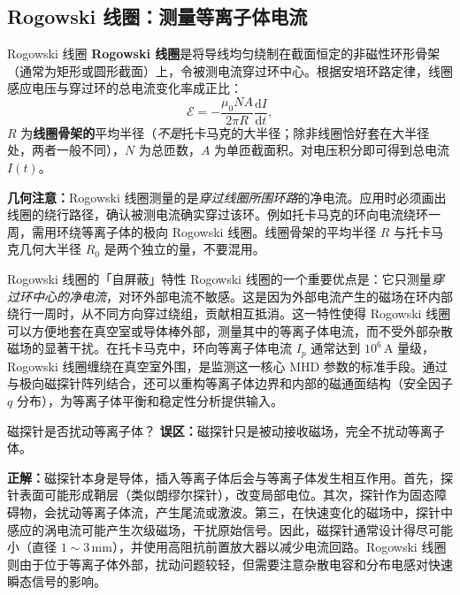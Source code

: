 \documentclass[12pt,a4paper,openany,oneside]{book}
\newcommand{\diff}{\mathrm{d}}
\begin{document}
\subsection{Rogowski 线圈：测量等离子体电流}

\begin{definition}{Rogowski 线圈}{}{}
\textbf{Rogowski 线圈}是将导线均匀绕制在截面恒定的非磁性环形骨架（通常为矩形或圆形截面）上，令被测电流穿过环中心。根据安培环路定律，线圈感应电压与穿过环的总电流变化率成正比：
\begin{equation}
\mathcal{E} = -\frac{\mu_0 N A}{2\pi R}\frac{\diff I}{\diff t},
\label{eq:rogowski}
\end{equation}
$R$ 为\textbf{线圈骨架的}平均半径（\emph{不是}托卡马克的大半径；除非线圈恰好套在大半径处，两者一般不同），$N$ 为总匝数，$A$ 为单匝截面积。对电压积分即可得到总电流 $I(t)$。

\textbf{几何注意：}Rogowski 线圈测量的是\emph{穿过线圈所围环路}的净电流。应用时必须画出线圈的绕行路径，确认被测电流确实穿过该环。例如托卡马克的环向电流绕环一周，需用环绕等离子体的极向 Rogowski 线圈。线圈骨架的平均半径 $R$ 与托卡马克几何大半径 $R_0$ 是两个独立的量，不要混用。
\end{definition}

\begin{insight}{Rogowski 线圈的「自屏蔽」特性}{}
Rogowski 线圈的一个重要优点是：它只测量\emph{穿过环中心的净电流}，对环外部电流不敏感。这是因为外部电流产生的磁场在环内部绕行一周时，从不同方向穿过绕组，贡献相互抵消。这一特性使得 Rogowski 线圈可以方便地套在真空室或导体棒外部，测量其中的等离子体电流，而不受外部杂散磁场的显著干扰。在托卡马克中，环向等离子体电流 $I_p$ 通常达到 $10^6\,\mathrm{A}$ 量级，Rogowski 线圈缠绕在真空室外围，是监测这一核心 MHD 参数的标准手段。通过与极向磁探针阵列结合，还可以重构等离子体边界和内部的磁通面结构（安全因子 $q$ 分布），为等离子体平衡和稳定性分析提供输入。
\end{insight}

\begin{warning}{磁探针是否扰动等离子体？}{}
\textbf{误区：}磁探针只是被动接收磁场，完全不扰动等离子体。

\textbf{正解：}磁探针本身是导体，插入等离子体后会与等离子体发生相互作用。首先，探针表面可能形成鞘层（类似朗缪尔探针），改变局部电位。其次，探针作为固态障碍物，会扰动等离子体流，产生尾流或激波。第三，在快速变化的磁场中，探针中感应的涡电流可能产生次级磁场，干扰原始信号。因此，磁探针通常设计得尽可能小（直径 $1\sim 3\,\mathrm{mm}$），并使用高阻抗前置放大器以减少电流回路。Rogowski 线圈则由于位于等离子体外部，扰动问题较轻，但需要注意杂散电容和分布电感对快速瞬态信号的影响。
\end{warning}
\end{document}
